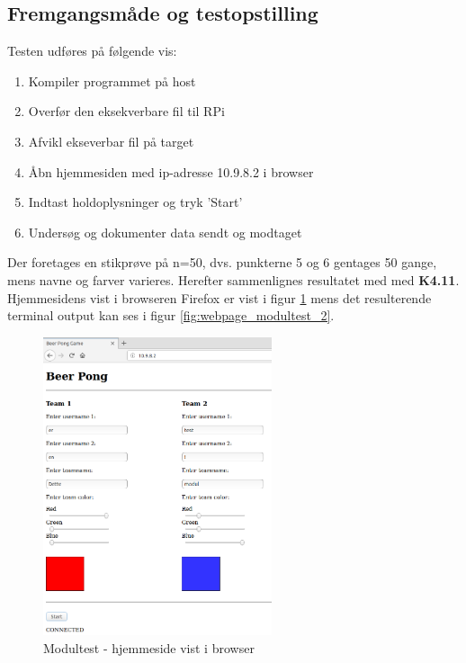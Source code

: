 \documentclass[Modultest/Modultest_main.tex]{subfiles}
\begin{document}
\subsection{Fremgangsmåde og testopstilling}
Testen udføres på følgende vis:
\begin{enumerate}
    \item Kompiler programmet på host
    \item Overfør den eksekverbare fil til RPi 
    \item Afvikl ekseverbar fil på target
    \item Åbn hjemmesiden med ip-adresse 10.9.8.2 i browser
    \item Indtast holdoplysninger og tryk 'Start'
    \item Undersøg og dokumenter data sendt og modtaget
\end{enumerate}
Der foretages en stikprøve på n=50, dvs. punkterne 5 og 6 gentages 50 gange, mens navne og farver varieres. Herefter sammenlignes resultatet med med \textbf{K4.11}.
Hjemmesidens vist i browseren Firefox er vist i figur \ref{fig:webpage_modultest_1} mens det resulterende terminal output kan ses i figur \ref{fig:webpage_modultest_2}.
\begin{figure}[H]
    \centering
    \includegraphics[width=0.6\textwidth]{Modultest/WebPage/graphics/modultest_1.png}
    \caption{Modultest - hjemmeside vist i browser}
    \label{fig:webpage_modultest_1}
\end{figure}
\end{document}
